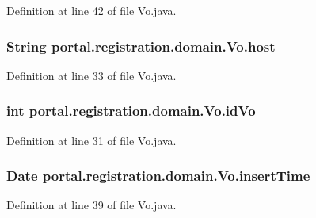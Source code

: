 Definition at line 42 of file Vo.java.

\hypertarget{classportal_1_1registration_1_1domain_1_1Vo_a39734694dfee646e14aa1a49cb06e5a0}{
\subsubsection[{host}]{\setlength{\rightskip}{0pt plus 5cm}String {\bf portal.registration.domain.Vo.host}}}
\label{classportal_1_1registration_1_1domain_1_1Vo_a39734694dfee646e14aa1a49cb06e5a0}


Definition at line 33 of file Vo.java.

\hypertarget{classportal_1_1registration_1_1domain_1_1Vo_ad30081c762c1013c30f53f07a88aaf6c}{
\subsubsection[{idVo}]{\setlength{\rightskip}{0pt plus 5cm}int {\bf portal.registration.domain.Vo.idVo}}}
\label{classportal_1_1registration_1_1domain_1_1Vo_ad30081c762c1013c30f53f07a88aaf6c}


Definition at line 31 of file Vo.java.

\hypertarget{classportal_1_1registration_1_1domain_1_1Vo_a151311e5b51385dffb6d6d207159ac65}{
\subsubsection[{insertTime}]{\setlength{\rightskip}{0pt plus 5cm}Date {\bf portal.registration.domain.Vo.insertTime}}}
\label{classportal_1_1registration_1_1domain_1_1Vo_a151311e5b51385dffb6d6d207159ac65}


Definition at line 39 of file Vo.java.

